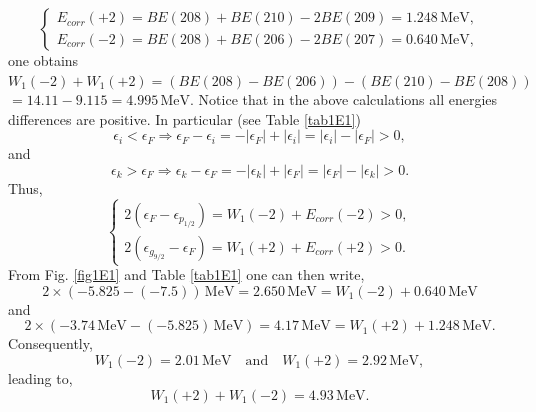  \begin{equation*}
 \left\{
 \begin{array}{c}
  E_{corr}(+2)=BE(208)+BE(210)-2BE(209)=1.248\,\text{MeV},\\ 
  E_{corr}(-2)=BE(208)+BE(206)-2BE(207)=0.640\,\text{MeV},
 \end{array}
 \right.
 \end{equation*}
 one obtains
 $W_1(-2)+W_1(+2)=(BE(208)-BE(206))-(BE(210)-BE(208))$
 $=14.11-9.115=4.995 \,\text{MeV}$. Notice that in the above calculations all energies differences are positive. In particular (see Table \ref{tab1E1})  
\begin{equation*}
\epsilon_i<\epsilon_F\Rightarrow \epsilon_F-\epsilon_i=-|\epsilon_F|+|\epsilon_i|=|\epsilon_i|-|\epsilon_F|>0,
\end{equation*}
and
\begin{equation*}
\epsilon_k>\epsilon_F\Rightarrow \epsilon_k-\epsilon_F=-|\epsilon_k|+|\epsilon_F|=|\epsilon_F|-|\epsilon_k|>0.
\end{equation*}
Thus,
\begin{equation*}
\left\{
\begin{array}{c}
 2(\epsilon_F-\epsilon_{p_{1/2}})=W_1(-2)+E_{corr}(-2)>0,\\ 
 2(\epsilon_{g_{9/2}}-\epsilon_F)=W_1(+2)+E_{corr}(+2)>0.
\end{array}
\right.
\end{equation*}
From Fig. \ref{fig1E1} and Table \ref{tab1E1} one can then write,
\begin{equation*} 
2\times(-5.825-(-7.5))\,\text{MeV}=2.650\,\text{MeV}=W_1(-2)+0.640\,\text{MeV}
\end{equation*}
and 
\begin{equation*} 
2\times(-3.74\, \text{MeV}-(-5.825)\,\text{MeV})=4.17\, \text{MeV}=W_1(+2)+1.248\, \text{MeV}.
\end{equation*}
Consequently,
\begin{equation*} 
W_1(-2)=2.01\,\text{MeV}\quad \text{and} \quad W_1(+2)=2.92\,\text{MeV},
\end{equation*}
leading to,
\begin{equation}\label{eq2.5.1} 
W_1(+2)+W_1(-2)=4.93\,\text{MeV}.
\end{equation}

